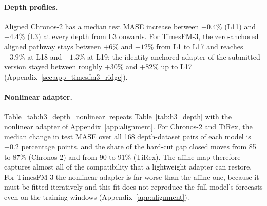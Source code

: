 \documentclass{article} %
\begin{document}
\paragraph{Depth profiles.} Aligned Chronos-2 has a median test MASE increase between $+0.4\%$
(L11) and $+4.4\%$ (L3) at every depth from L3 onwards. For TimesFM-3, the zero-anchored aligned
pathway stays between $+6\%$ and $+12\%$ from L1 to L17 and reaches $+3.9\%$ at L18 and $+1.3\%$ at
L19; the identity-anchored adapter of the submitted version stayed between roughly $+30\%$ and
$+82\%$ up to L17 (Appendix~\ref{sec:app_timesfm3_ridge}).

\paragraph{Nonlinear adapter.} Table~\ref{tab:h3_depth_nonlinear} repeats Table~\ref{tab:h3_depth}
with the nonlinear adapter of Appendix~\ref{app:alignment}. For Chronos-2 and TiRex, the median
change in test MASE over all 168 depth-dataset pairs of each model is $-0.2$ percentage points, and
the share of the hard-cut gap closed moves from 85 to 87\% (Chronos-2) and from 90 to 91\% (TiRex).
The affine map therefore captures almost all of the compatibility that a lightweight adapter can
restore. For TimesFM-3 the nonlinear adapter is far worse than the affine one, because it must be
fitted iteratively and this fit does not reproduce the full model's forecasts even on the training
windows (Appendix~\ref{app:alignment}).
\end{document}
